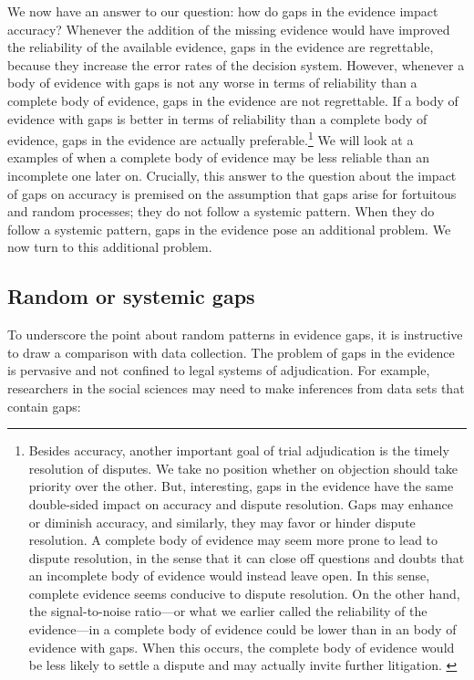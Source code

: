 \documentclass[
  10pt,
  dvipsnames,enabledeprecatedfontcommands]{scrartcl}
\begin{document}
We now have an answer to our question: how do gaps in the evidence
impact accuracy? Whenever the addition of the missing evidence would
have improved the reliability of the available evidence, gaps in the
evidence are regrettable, because they increase the error rates of the
decision system. However, whenever a body of evidence with gaps is not
any worse in terms of reliability than a complete body of evidence, gaps
in the evidence are not regrettable. If a body of evidence with gaps is
better in terms of reliability than a complete body of evidence, gaps in
the evidence are actually preferable.\footnote{Besides accuracy, another
  important goal of trial adjudication is the timely resolution of
  disputes. We take no position whether on objection should take
  priority over the other. But, interesting, gaps in the evidence have
  the same double-sided impact on accuracy and dispute resolution. Gaps
  may enhance or diminish accuracy, and similarly, they may favor or
  hinder dispute resolution. A complete body of evidence may seem more
  prone to lead to dispute resolution, in the sense that it can close
  off questions and doubts that an incomplete body of evidence would
  instead leave open. In this sense, complete evidence seems conducive
  to dispute resolution. On the other hand, the signal-to-noise
  ratio---or what we earlier called the reliability of the evidence---in
  a complete body of evidence could be lower than in an body of evidence
  with gaps. When this occurs, the complete body of evidence would be
  less likely to settle a dispute and may actually invite further
  litigation. \label{footnote:dispute-resolution}} We will look at a
examples of when a complete body of evidence may be less reliable than
an incomplete one later on. Crucially, this answer to the question about
the impact of gaps on accuracy is premised on the assumption that gaps
arise for fortuitous and random processes; they do not follow a systemic
pattern. When they do follow a systemic pattern, gaps in the evidence
pose an additional problem. We now turn to this additional problem.

\hypertarget{random-or-systemic-gaps}{%
\subsection{Random or systemic gaps}\label{random-or-systemic-gaps}}

To underscore the point about random patterns in evidence gaps, it is
instructive to draw a comparison with data collection. The problem of
gaps in the evidence is pervasive and not confined to legal systems of
adjudication. For example, researchers in the social sciences may need
to make inferences from data sets that contain gaps:
\end{document}

